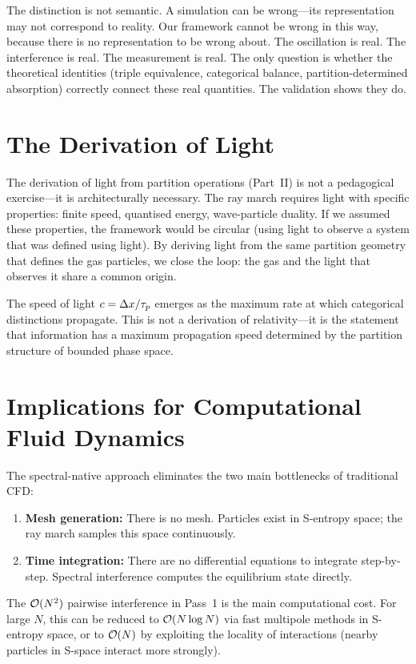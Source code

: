 The distinction is not semantic. A simulation can be wrong---its representation may not correspond to reality. Our framework cannot be wrong in this way, because there is no representation to be wrong about. The oscillation is real. The interference is real. The measurement is real. The only question is whether the theoretical identities (triple equivalence, categorical balance, partition-determined absorption) correctly connect these real quantities. The validation shows they do.

\section{The Derivation of Light}
\label{sec:light_discuss}

The derivation of light from partition operations (Part~II) is not a pedagogical exercise---it is architecturally necessary. The ray march requires light with specific properties: finite speed, quantised energy, wave-particle duality. If we assumed these properties, the framework would be circular (using light to observe a system that was defined using light). By deriving light from the same partition geometry that defines the gas particles, we close the loop: the gas and the light that observes it share a common origin.

The speed of light $c = \Delta x/\tau_p$ emerges as the maximum rate at which categorical distinctions propagate. This is not a derivation of relativity---it is the statement that information has a maximum propagation speed determined by the partition structure of bounded phase space.

\section{Implications for Computational Fluid Dynamics}
\label{sec:implications}

The spectral-native approach eliminates the two main bottlenecks of traditional CFD:
\begin{enumerate}
    \item \textbf{Mesh generation:} There is no mesh. Particles exist in S-entropy space; the ray march samples this space continuously.
    \item \textbf{Time integration:} There are no differential equations to integrate step-by-step. Spectral interference computes the equilibrium state directly.
\end{enumerate}

The $\mathcal{O}(N^2)$ pairwise interference in Pass~1 is the main computational cost. For large $N$, this can be reduced to $\mathcal{O}(N \log N)$ via fast multipole methods in S-entropy space, or to $\mathcal{O}(N)$ by exploiting the locality of interactions (nearby particles in S-space interact more strongly).


